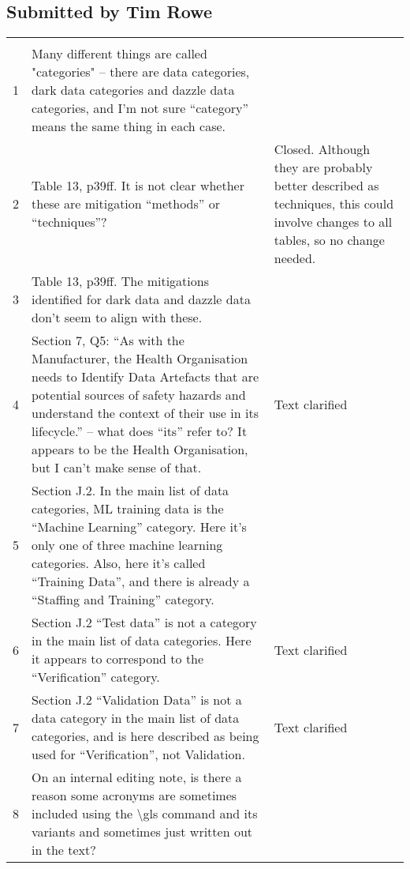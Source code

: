\subsection{Submitted by Tim Rowe}
\begin{longtable}[H]
{|L{}|L{}|L{}|}
\hline
{} &  & \\
\hline
  \endfirsthead
  \hline{} &  & \\\hline
  \endhead
  \endfoot
  \endlastfoot

  1 &
  Many different things are called "categories" – there are data categories, dark data categories
  and dazzle data categories, and I’m not sure “category” means the same thing in each case.
  & 
  \\\hline
  2 &
  Table 13, p39ff. It is not clear whether these are mitigation “methods” or “techniques”?
  & Closed. Although they are probably better described as techniques, this could involve changes to all tables, so no change needed.  %
  \\\hline
  
  3 &
  Table 13, p39ff. The mitigations identified for dark data and dazzle data don’t seem to align
  with these.
  &
  \\\hline
  4 &
  Section 7, Q5: “As with the Manufacturer, the Health Organisation needs to Identify Data
  Artefacts that are potential sources of safety hazards and understand the context of their use
  in its lifecycle.” – what does “its” refer to? It appears to be the Health Organisation,
  but I can't make sense of that.
  & Text clarified
  \\\hline
  5 &
  Section J.2. In the main list of data categories, ML training data is the “Machine Learning”
  category. Here it’s only one of three machine learning categories.
  Also, here it’s called “Training Data”, and there is already a “Staffing and Training” category.
  &
  \\\hline
  6 &
  Section J.2 “Test data” is not a category in the main list of data categories.
  Here it appears to correspond to the “Verification” category.
  & Text clarified
  \\\hline

  7 &
  Section J.2 “Validation Data” is not a data category in the main list of data categories,
  and is here described as being used for “Verification”, not Validation.
  & Text clarified
  \\\hline
  8 &
  On an internal editing note, is there a reason some acronyms are sometimes included using the \textbackslash gls command and its variants and sometimes just written out in the text?
  &
  \\\hline
\end{longtable}


